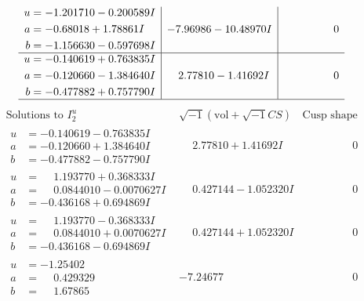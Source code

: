 \documentclass[1p]{elsarticle_modified}
\theoremstyle{definition}
\newcommand{\I}{\sqrt{-1}}
\begin{document}
$$\begin{array}{c|c|c}
\begin{aligned}
u &= -1.201710 - 0.200589 I \\
a &= -0.68018 + 1.78861 I \\
b &= -1.156630 - 0.597698 I\end{aligned}
 & -7.96986 - 10.48970 I & \phantom{-0.000000 } 0 \\ \hline\begin{aligned}
u &= -0.140619 + 0.763835 I \\
a &= -0.120660 - 1.384640 I \\
b &= -0.477882 + 0.757790 I\end{aligned}
 & \phantom{-}2.77810 - 1.41692 I & \phantom{-0.000000 } 0\\
 \hline 
 \end{array}$$\newpage$$\begin{array}{c|c|c}  
\text{Solutions to }I^u_{2}& \I (\text{vol} + \sqrt{-1}CS) & \text{Cusp shape}\\
 \hline 
\begin{aligned}
u &= -0.140619 - 0.763835 I \\
a &= -0.120660 + 1.384640 I \\
b &= -0.477882 - 0.757790 I\end{aligned}
 & \phantom{-}2.77810 + 1.41692 I & \phantom{-0.000000 } 0 \\ \hline\begin{aligned}
u &= \phantom{-}1.193770 + 0.368333 I \\
a &= \phantom{-}0.0844010 - 0.0070627 I \\
b &= -0.436168 + 0.694869 I\end{aligned}
 & \phantom{-}0.427144 - 1.052320 I & \phantom{-0.000000 } 0 \\ \hline\begin{aligned}
u &= \phantom{-}1.193770 - 0.368333 I \\
a &= \phantom{-}0.0844010 + 0.0070627 I \\
b &= -0.436168 - 0.694869 I\end{aligned}
 & \phantom{-}0.427144 + 1.052320 I & \phantom{-0.000000 } 0 \\ \hline\begin{aligned}
u &= -1.25402\phantom{ +0.000000I} \\
a &= \phantom{-}0.429329\phantom{ +0.000000I} \\
b &= \phantom{-}1.67865\phantom{ +0.000000I}\end{aligned}
 & -7.24677\phantom{ +0.000000I} & \phantom{-0.000000 } 0 \\ \hline\begin{aligned}

\end{aligned}
\end{array}$$
\end{document}
